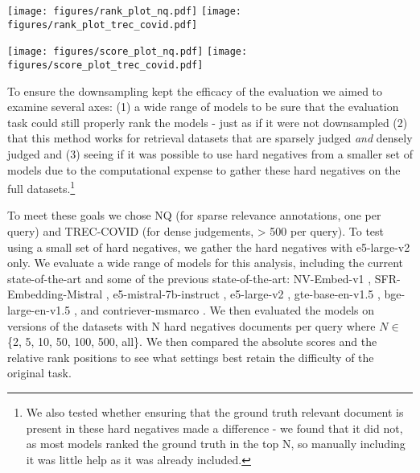 \begin{figure*}
    \centering
    \texttt{[image: figures/rank\_plot\_nq.pdf]}
    {\texttt{[image: figures/rank\_plot\_trec\_covid.pdf]}}
    \caption{Ranking of different models on subsampled versions of the datasets using hard negatives. We see that NQ can be reduced to just two documents per query (relevant + 1 hard negative) while still maintaining the rank while TREC-COVID is less stable.}
    \label{fig:ranking_scores_retrieval}
\end{figure*}

\begin{figure*}
    \centering
    \texttt{[image: figures/score\_plot\_nq.pdf]}
    {\texttt{[image: figures/score\_plot\_trec\_covid.pdf]}}
    \caption{Absolute scores of different models on subsampled versions of the datasets using hard negatives. NQ has 1 relevant document per query while TREC-COVID has 500+ relevant documents per query which is why we see NQ scores gradually increasing whereas TREC-COVID scores vary.}
    \label{fig:absolute_scores_retrieval}
\end{figure*}

To ensure the downsampling kept the efficacy of the evaluation we aimed to examine several axes: (1) a wide range of models to be sure that the evaluation task could still properly rank the models - just as if it were not downsampled (2) that this method works for retrieval datasets that are sparsely judged \textit{and} densely judged and (3) seeing if it was possible to use hard negatives from a smaller set of models due to the computational expense to gather these hard negatives on the full datasets.\footnote{We also tested whether ensuring that the ground truth relevant document is present in these hard negatives made a difference - we found that it did not, as most models ranked the ground truth in the top N, so manually including it was little help as it was already included.}

To meet these goals we chose NQ (for sparse relevance annotations, one per query) and TREC-COVID (for dense judgements, > 500 per query). To test using a small set of hard negatives, we gather the hard negatives with e5-large-v2 only.  We evaluate a wide range of models for this analysis, including the current state-of-the-art and some of the previous state-of-the-art: NV-Embed-v1 \citep{lee2024nvembed}, SFR-Embedding-Mistral \citep{SFRAIResearch2024}, e5-mistral-7b-instruct \citep{wang2023improving}, e5-large-v2 \citep{wang2022text}, gte-base-en-v1.5 \citep{li2023gte}, bge-large-en-v1.5 \citep{bge_embedding}, and contriever-msmarco \citep{izacard2021unsupervised}. We then evaluated the models on versions of the datasets with N hard negatives documents per query where $N \in $\{2, 5, 10, 50, 100, 500, all\}. We then compared the absolute scores and the relative rank positions to see what settings best retain the difficulty of the original task.

